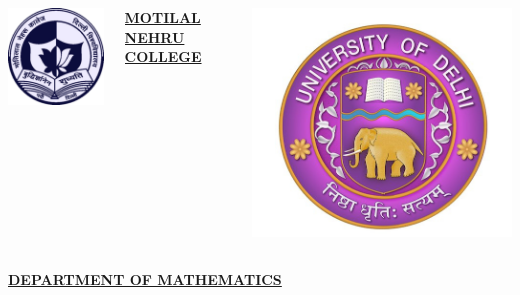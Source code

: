 \documentclass{beamer}
\begin{document}
\begin{frame}

\begin{columns}


\begin{column}{.35\textwidth}
\includegraphics[width=.35\textwidth]{mlnc.png}%
\end{column}


\begin{column}{.6\textwidth}
{\bf \underline{MOTILAL NEHRU COLLEGE }}\\ 
\end{column}


\begin{column}{.4\textwidth}
\includegraphics[width=.4\textwidth]{du.jpg}%
\end{column}


\end{columns}
\hspace{2.2cm} {\bf \underline{DEPARTMENT OF MATHEMATICS }}\\









 \end{frame}
\end{document}
